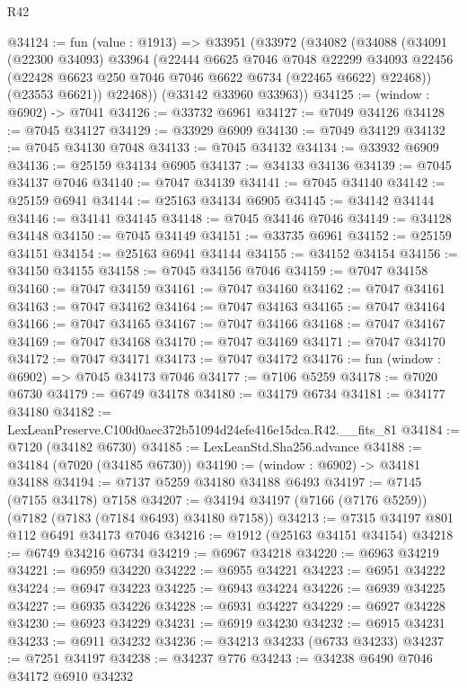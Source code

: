 \begin{lexlean}{R42}
\begin{coremodule}
{@34124 := fun (value : @1913) =>
  @33951
    (@33972
      (@34082
        (@34088
          (@34091
            (@22300 @34093)
            @33964
            (@22444
              @6625
              @7046
              @7048
              @22299
              @34093
              @22456
              (@22428 @6623 @250 @7046 @7046 @6622 @6734 (@22465 @6622) @22468))
            (@23553 @6621))
          @22468))
      (@33142 @33960 @33963))
@34125 := (window : @6902) -> @7041
@34126 := @33732 @6961
@34127 := @7049 @34126
@34128 := @7045 @34127
@34129 := @33929 @6909
@34130 := @7049 @34129
@34132 := @7045 @34130 @7048
@34133 := @7045 @34132
@34134 := @33932 @6909
@34136 := @25159 @34134 @6905
@34137 := @34133 @34136
@34139 := @7045 @34137 @7046
@34140 := @7047 @34139
@34141 := @7045 @34140
@34142 := @25159 @6941
@34144 := @25163 @34134 @6905
@34145 := @34142 @34144
@34146 := @34141 @34145
@34148 := @7045 @34146 @7046
@34149 := @34128 @34148
@34150 := @7045 @34149
@34151 := @33735 @6961
@34152 := @25159 @34151
@34154 := @25163 @6941 @34144
@34155 := @34152 @34154
@34156 := @34150 @34155
@34158 := @7045 @34156 @7046
@34159 := @7047 @34158
@34160 := @7047 @34159
@34161 := @7047 @34160
@34162 := @7047 @34161
@34163 := @7047 @34162
@34164 := @7047 @34163
@34165 := @7047 @34164
@34166 := @7047 @34165
@34167 := @7047 @34166
@34168 := @7047 @34167
@34169 := @7047 @34168
@34170 := @7047 @34169
@34171 := @7047 @34170
@34172 := @7047 @34171
@34173 := @7047 @34172
@34176 := fun (window : @6902) => @7045 @34173 @7046
@34177 := @7106 @5259
@34178 := @7020 @6730
@34179 := @6749 @34178
@34180 := @34179 @6734
@34181 := @34177 @34180
@34182 := LexLeanPreserve.C100d0aec372b51094d24efe416e15dca.R42.__fits_81
@34184 := @7120 (@34182 @6730)
@34185 := LexLeanStd.Sha256.advance
@34188 := @34184 (@7020 (@34185 @6730))
@34190 := (window : @6902) -> @34181 @34188
@34194 := @7137 @5259 @34180 @34188 @6493
@34197 := @7145 (@7155 @34178) @7158
@34207 := @34194 @34197 (@7166 (@7176 @5259)) (@7182 (@7183 (@7184 @6493) @34180 @7158))
@34213 := @7315 @34197 @801 @112 @6491 @34173 @7046
@34216 := @1912 (@25163 @34151 @34154)
@34218 := @6749 @34216 @6734
@34219 := @6967 @34218
@34220 := @6963 @34219
@34221 := @6959 @34220
@34222 := @6955 @34221
@34223 := @6951 @34222
@34224 := @6947 @34223
@34225 := @6943 @34224
@34226 := @6939 @34225
@34227 := @6935 @34226
@34228 := @6931 @34227
@34229 := @6927 @34228
@34230 := @6923 @34229
@34231 := @6919 @34230
@34232 := @6915 @34231
@34233 := @6911 @34232
@34236 := @34213 @34233 (@6733 @34233)
@34237 := @7251 @34197
@34238 := @34237 @776
@34243 := @34238 @6490 @7046 @34172 @6910 @34232
}
\end{coremodule}
\end{lexlean}
